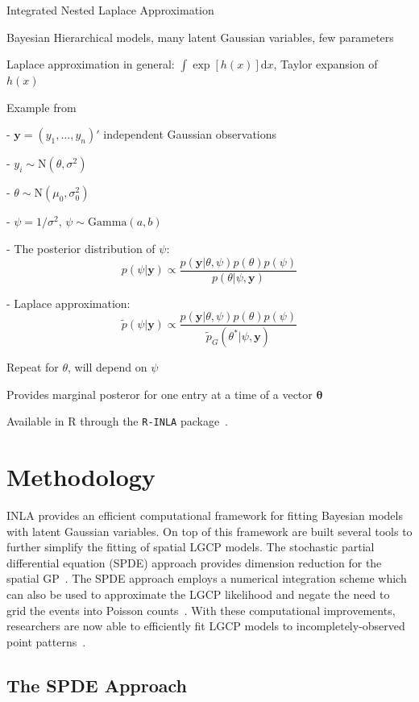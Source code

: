 \documentclass[]{interact}
\begin{document}
Integrated Nested Laplace Approximation

Bayesian Hierarchical models, many latent Gaussian variables, few parameters

Laplace approximation in general: $\int \exp[h(x)]\mathrm{d}x$, Taylor expansion of $h(x)$

Example from \cite{rinla}

- $\mathbf{y} = (y_{1}, \dots, y_{n})'$ independent Gaussian observations

- $y_{i} \sim \mathrm{N}(\theta, \sigma^{2})$

- $\theta \sim \mathrm{N}(\mu_{0}, \sigma_{0}^{2})$

- $\psi = 1/\sigma^{2}$, $\psi \sim \mathrm{Gamma}(a, b)$

- The posterior distribution of $\psi$:
$$p(\psi|\mathbf{y}) \propto \frac{p(\mathbf{y} | \theta, \psi) p(\theta) p(\psi)}
{p(\theta | \psi, \mathbf{y})}$$

- Laplace approximation:
$$\tilde{p}(\psi|\mathbf{y}) \propto \frac{p(\mathbf{y} | \theta, \psi) p(\theta) p(\psi)}
{\tilde{p}_{G}(\theta^{*} | \psi, \mathbf{y})}$$

Repeat for $\theta$, will depend on $\psi$

Provides marginal posteror for one entry at a time of a vector $\boldsymbol{\theta}$

Available in R through the \texttt{R-INLA} package~\cite{inlar}.


\section{Methodology}

INLA provides an efficient computational framework for fitting Bayesian models
with latent Gaussian variables. On top of this framework are built several
tools to further simplify the fitting of spatial LGCP models. The stochastic
partial differential equation (SPDE) approach provides dimension reduction for
the spatial GP~\cite{lindgrenetal}. The SPDE approach employs a numerical
integration scheme which can also be used to approximate the LGCP likelihood
and negate the need to grid the events into Poisson counts~\cite{simpsonetal}.
With these computational improvements, researchers are now able to efficiently
fit LGCP models to incompletely-observed point patterns~\cite{yuanetal}.  


\subsection{The SPDE Approach}
\end{document}
